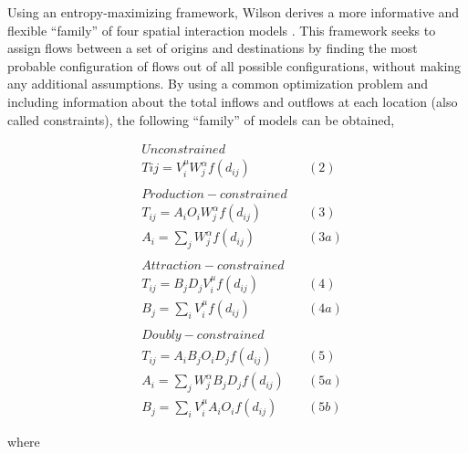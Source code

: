 \documentclass[11pt]{article}
\begin{document}
Using an entropy-maximizing framework, Wilson derives a more informative
and flexible ``family'' of four spatial interaction models \citep{wilson_family_1971}.
 This framework seeks to assign flows between a set of origins and
destinations by finding the most probable configuration of flows out of
all possible configurations, without making any additional assumptions.
By using a common optimization problem and including information about
the total inflows and outflows at each location (also called
constraints), the following ``family'' of models can be obtained,

\[
\begin{align}
&Unconstrained \  \\
&Tij = V_{i}^\mu W_{j}^\alpha  f(d_{ij}) \quad & (2) \\
\\
&Production-constrained \\
&T_{ij} = A_{i}O_{i}W_{j}^\alpha f(d_{ij}) \quad & (3) \\
&A_{i} = \sum_{j} W_{j}^\alpha f(d_{ij}) \quad & (3a) \\
\\
&Attraction-constrained \\
&T_{ij} = B_{j}D_{j}V_{i}^\mu f(d_{ij}) \quad & (4) \\
&B_{j} = \sum_{i} V_{i}^\mu f(d_{ij}) \quad & (4a) \\
\\
&Doubly-constrained \\
&T_{ij} = A_{i}B_{j}O_{i}D_{j}f(d_{ij}) \quad & (5) \\
&A_{i} = \sum_{j} W_{j}^\alpha B_{j} D_{j} f(d_{ij}) \quad & (5a) \\
&B_{j} = \sum_{i} V_{i}^\mu A_{i} O_{i} f(d_{ij}) \quad & (5b)
\end{align}
\]

where
\end{document}
